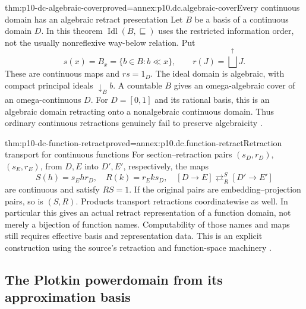 \begin{hbtheorem}{thm:p10-dc-algebraic-cover}{proved=annex:p10.dc.algebraic-cover}{Every continuous domain has an algebraic retract presentation}
Let \(B\) be a basis of a continuous domain \(D\). In this theorem
\(\operatorname{Idl}(B,\sqsubseteq)\) uses the restricted information
order, not the usually nonreflexive way-below relation. Put
\[
 s(x)=B_x=\{b\in B:b\ll x\},\qquad
 r(J)=\bigsqcup^{\uparrow}J.
\]
These are continuous maps and \(rs=1_D\).
The ideal domain is algebraic, with compact principal ideals
\(\downarrow_B b\). A countable \(B\) gives an omega-algebraic
cover of an omega-continuous \(D\).
For \(D=[0,1]\) and its rational basis, this is an algebraic domain
retracting onto a nonalgebraic continuous domain. Thus ordinary continuous
retractions genuinely fail to preserve algebraicity
\cite[Theorem~3.1.5; Proposition~3.1.6, p.~35]
{AbramskyJungCorrectedExpandedDomainTheory}.
\end{hbtheorem}

\begin{hbtheorem}{thm:p10-dc-function-retract}{proved=annex:p10.dc.function-retract}{Retraction transport for continuous functions}
For section--retraction pairs \((s_D,r_D)\), \((s_E,r_E)\),
from \(D,E\) into \(D',E'\), respectively, the maps
\[
 S(h)=s_Ehr_D,
 \quad R(k)=r_Eks_D,
 \quad [D\longrightarrow E]\mathrel{\mathop{\rightleftarrows}^{S}_{R}}
       [D'\longrightarrow E']
\]
are continuous and satisfy \(RS=1\).
If the original pairs are embedding--projection pairs, so is \((S,R)\).
Products transport retractions coordinatewise as well.
In particular this gives an actual retract representation of a function
domain, not merely a bijection of function names. Computability of those
names and maps still requires effective basis and representation data.
This is an explicit construction using the source's retraction and
function-space machinery \cite[pp.~34--36,43]
{AbramskyJungCorrectedExpandedDomainTheory}.
\end{hbtheorem}

\subsection{The Plotkin powerdomain from its approximation basis}

